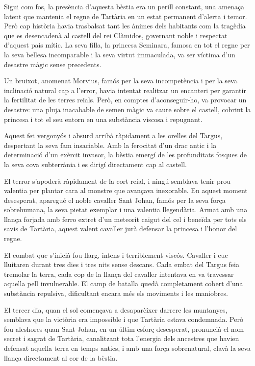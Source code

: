 Sigui com fos, la presència d’aquesta bèstia era un perill constant, una amenaça latent que mantenia el regne de Tartària en un estat permanent d’alerta i temor. Però cap història havia trasbalsat tant les ànimes dels habitants com la tragèdia que es desencadenà al castell del rei Clàmidos, governant noble i respectat d’aquest país mític. La seva filla, la princesa Seminara, famosa en tot el regne per la seva bellesa incomparable i la seva virtut immaculada, va ser víctima d’un desastre màgic sense precedents.

Un bruixot, anomenat Morvius, famós per la seva incompetència i per la seva inclinació natural cap a l’error, havia intentat realitzar un encanteri per garantir la fertilitat de les terres reials. Però, en comptes d’aconseguir-ho, va provocar un desastre: una pluja inacabable de semen màgic va caure sobre el castell, cobrint la princesa i tot el seu entorn en una substància viscosa i repugnant.

Aquest fet vergonyós i absurd arribà ràpidament a les orelles del Targus, despertant la seva fam insaciable. Amb la ferocitat d’un drac antic i la determinació d’un exèrcit invasor, la bèstia emergí de les profunditats fosques de la seva cova subterrània i es dirigí directament cap al castell.

El terror s’apoderà ràpidament de la cort reial, i ningú semblava tenir prou valentia per plantar cara al monstre que avançava inexorable. En aquest moment desesperat, aparegué el noble cavaller Sant Johan, famós per la seva força sobrehumana, la seva pietat exemplar i una valentia llegendària. Armat amb una llança forjada amb ferro extret d’un meteorit caigut del cel i beneïda per tots els savis de Tartària, aquest valent cavaller jurà defensar la princesa i l’honor del regne.

El combat que s’inicià fou llarg, intens i terriblement viscós. Cavaller i cuc lluitaren durant tres dies i tres nits sense descans. Cada embat del Targus feia tremolar la terra, cada cop de la llança del cavaller intentava en va travessar aquella pell invulnerable. El camp de batalla quedà completament cobert d’una substància repulsiva, dificultant encara més els moviments i les maniobres.

El tercer dia, quan el sol començava a desaparèixer darrere les muntanyes, semblava que la victòria era impossible i que Tartària estava condemnada. Però fou aleshores quan Sant Johan, en un últim esforç desesperat, pronuncià el nom secret i sagrat de Tartària, canalitzant tota l’energia dels ancestres que havien defensat aquella terra en temps antics, i amb una força sobrenatural, clavà la seva llança directament al cor de la bèstia.

